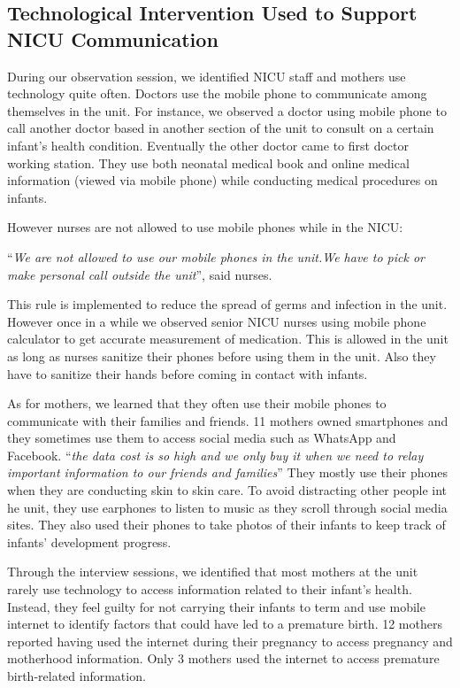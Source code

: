  \subsection{Technological Intervention Used to Support NICU Communication}
During our observation session, we identified NICU staff and mothers use technology quite often. Doctors use the mobile phone to communicate among themselves in the unit. For instance, we observed a doctor using mobile phone to call another doctor based in another section of the unit to consult on a certain infant’s health condition. Eventually the other doctor came  to first doctor working station. They use both neonatal medical book and online medical information (viewed via mobile phone) while conducting medical procedures on infants.

However nurses are not allowed to use mobile phones while in the NICU:

\enquote{\itshape We are not allowed to use our mobile phones in the unit.We have to pick or make personal call outside the unit}, said nurses. \bigbreak

This rule is implemented to reduce the spread of germs and infection in the unit. However once in a while we observed senior NICU nurses using mobile phone calculator to get accurate measurement of medication. This is allowed in the unit as long as nurses sanitize their phones before using them in the unit. Also they have to sanitize their hands before coming in contact with infants.

As for mothers, we learned that they often use their mobile phones to communicate with their families and friends. 11 mothers owned smartphones and they sometimes use them to access social media such as WhatsApp and Facebook.
\enquote{\itshape the data cost is so high and we only buy it when we need to relay important information to our friends and families} \bigbreak
They mostly use their phones when they are conducting skin to skin care. To avoid distracting other people int he unit, they use earphones to listen to music as they scroll through social media sites. They also used their phones to take photos of their infants to keep track of infants’ development progress. 

Through the interview sessions, we identified that most mothers at the unit rarely use technology to access information related to their infant’s health. Instead, they feel guilty for not carrying their infants to term and use mobile internet to identify factors that could have led to a premature birth. 12 mothers reported having used the internet during their pregnancy to access pregnancy and motherhood information. Only 3 mothers used the internet to access premature birth-related information. 


